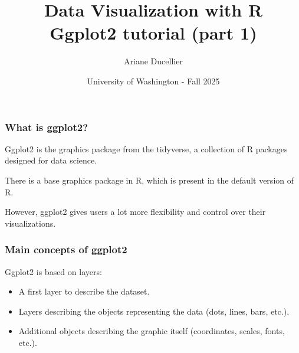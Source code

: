 \documentclass{beamer}
\title[Data Visualization with R - Ggplot2 tutorial (part 1)]{Data Visualization with R \\ Ggplot2 tutorial (part 1)}
\author{Ariane Ducellier}
\date{University of Washington - Fall 2025}
\begin{document}
	\begin{frame}
		\titlepage
	\end{frame}

	\begin{frame}
		\frametitle{What is ggplot2?}

		Ggplot2 is the graphics package from the tidyverse, a collection of R packages designed for data science. 

		\vspace{2em}

		There is a base graphics package in R, which is present in the default version of R.

		\vspace{2em}

		However, ggplot2 gives users a lot more flexibility and control over their visualizations.
		
	\end{frame}

	\begin{frame}
		\frametitle{Main concepts of ggplot2}

		Ggplot2 is based on layers:

		\vspace{2em}
		
		\begin{itemize}
		\setlength{\itemsep}{1em}
			\item A first layer to describe the dataset.
			\item Layers describing the objects representing the data (dots, lines, bars, etc.).
			\item Additional objects describing the graphic itself (coordinates, scales, fonts, etc.).
		\end{itemize}

	\end{frame}
\end{document}
